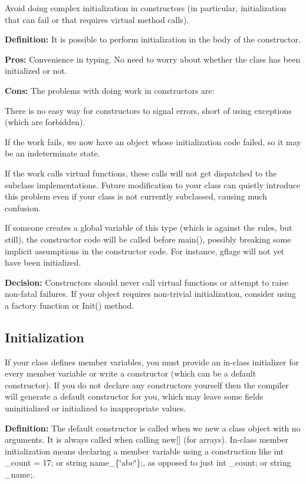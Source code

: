 Avoid doing complex initialization in constructors (in particular, initialization that can fail or that requires virtual method calls).

{\bfseries Definition\+:} It is possible to perform initialization in the body of the constructor.

{\bfseries Pros\+:} Convenience in typing. No need to worry about whether the class has been initialized or not.

{\bfseries Cons\+:} The problems with doing work in constructors are\+:


\begin{DoxyItemize}
\item There is no easy way for constructors to signal errors, short of using exceptions (which are forbidden).
\item If the work fails, we now have an object whose initialization code failed, so it may be an indeterminate state.
\item If the work calls virtual functions, these calls will not get dispatched to the subclass implementations. Future modification to your class can quietly introduce this problem even if your class is not currently subclassed, causing much confusion.
\item If someone creates a global variable of this type (which is against the rules, but still), the constructor code will be called before main(), possibly breaking some implicit assumptions in the constructor code. For instance, gflags will not yet have been initialized.
\end{DoxyItemize}

{\bfseries Decision\+:} Constructors should never call virtual functions or attempt to raise non-\/fatal failures. If your object requires non-\/trivial initialization, consider using a factory function or Init() method.

\subsection*{Initialization}

If your class defines member variables, you must provide an in-\/class initializer for every member variable or write a constructor (which can be a default constructor). If you do not declare any constructors yourself then the compiler will generate a default constructor for you, which may leave some fields uninitialized or initialized to inappropriate values.

{\bfseries Definition\+:} The default constructor is called when we new a class object with no arguments. It is always called when calling {\ttfamily new\mbox{[}\mbox{]}} (for arrays). In-\/class member initialization means declaring a member variable using a construction like {\ttfamily int \+\_\+count = 17;} or {\ttfamily string name\+\_\+\{\char`\"{}abc\char`\"{}\};}, as opposed to just {\ttfamily int \+\_\+count;} or {\ttfamily string \+\_\+name;}.

